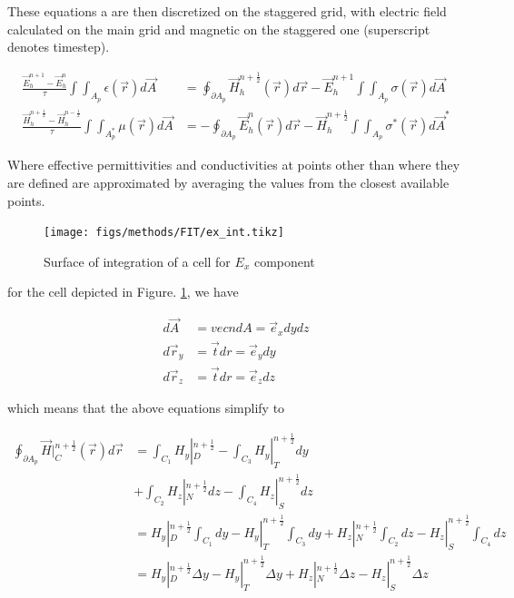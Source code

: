             These equations a are then discretized on the staggered grid, with electric field calculated on the main
            grid and magnetic on the staggered one (superscript denotes timestep).

            \begin{align}
                \frac{\vec{E}_h^{n+1} - \vec{E}_h^{n}}{\tau}\int\int_{A_p}\epsilon(\vec{r})d\vec{A}
                    &= \oint_{\partial A_p}\vec{H}_h^{n+\frac{1}{2}}(\vec{r})d\vec{r} - \vec{E}_h^{n+1}\int\int_{A_p}\sigma(\vec{r})d\vec{A} \\
                \frac{\vec{H}_h^{n+\frac{1}{2}} - \vec{H}_h^{n-\frac{1}{2}}}{\tau} \int\int_{A_p^*}\mu(\vec{r})d\vec{A}
                    &= - \oint_{\partial A_p}\vec{E}_h^{n}(\vec{r})d\vec{r} - \vec{H}_h^{n+\frac{1}{2}}\int\int_{A_p}\sigma^*(\vec{r})d\vec{A}^*
            \end{align}

            Where effective permittivities and conductivities at points other than where they are defined are
            approximated by averaging the values from the closest available points.

            \begin{figure}
                \centering
                \texttt{[image: figs/methods/FIT/ex\_int.tikz]}
                \caption{Surface of integration of a cell for $E_x$ component}
                \label{fig:Ex_Int}
            \end{figure}

            for the cell depicted in Figure. \ref{fig:Ex_Int}, we have

            \begin{align}
                d\vec{A} &= vec{n}dA = \vec{e}_xdydz \\
                d\vec{r}_y &= \vec{t}dr = \vec{e}_ydy \\
                d\vec{r}_z &= \vec{t}dr = \vec{e}_zdz
            \end{align}

            which means that the above equations simplify to

            \begin{align}
                \oint_{\partial A_p} \vec{H}|^{n+\frac{1}{2}}_{C}(\vec{r})d\vec{r} &= \int_{C_1}H_y|_D^{n+\frac{1}{2}} - \int_{C_3} H_y|_T^{n+\frac{1}{2}}dy \\
                    &+\int_{C_2}H_z|_{N}^{n+\frac{1}{2}}dz - \int_{C_4}H_z|_{S}^{n+\frac{1}{2}}dz \\
                    &= H_y|_D^{n+\frac{1}{2}}\int_{C_1}dy - H_y|_T^{n+\frac{1}{2}} \int_{C_3} dy +H_z|_{N}^{n+\frac{1}{2}}\int_{C_2}dz - H_z|_{S}^{n+\frac{1}{2}}\int_{C_4}dz\\
                    &= H_y|_D^{n+\frac{1}{2}}\Delta y - H_y|_T^{n+\frac{1}{2}} \Delta y +H_z|_{N}^{n+\frac{1}{2}}\Delta z - H_z|_{S}^{n+\frac{1}{2}}\Delta z\\
            \end{align}

